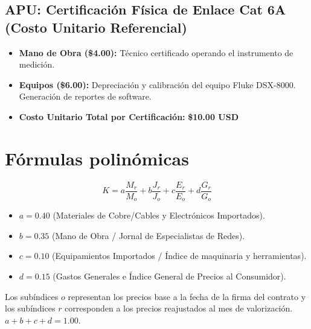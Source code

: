 \subsection*{APU: Certificación Física de Enlace Cat 6A (Costo Unitario Referencial)}

\begin{itemize}
    \item \textbf{Mano de Obra (\$4.00):} Técnico certificado operando el instrumento de medición.
    \item \textbf{Equipos (\$6.00):} Depreciación y calibración del equipo Fluke DSX-8000. Generación de reportes de software.
    \item \textbf{Costo Unitario Total por Certificación:} \textbf{\$10.00 USD}
\end{itemize}

\section{Fórmulas polinómicas}

$$K = a\frac{M_r}{M_o} + b\frac{J_r}{J_o} + c\frac{E_r}{E_o} + d\frac{G_r}{G_o}$$

\begin{itemize}
    \item $a = 0.40$ (Materiales de Cobre/Cables y Electrónicos Importados).
    \item $b = 0.35$ (Mano de Obra / Jornal de Especialistas de Redes).
    \item $c = 0.10$ (Equipamientos Importados / Índice de maquinaria y herramientas).
    \item $d = 0.15$ (Gastos Generales e Índice General de Precios al Consumidor).
\end{itemize}
Los subíndices $o$ representan los precios base a la fecha de la firma del contrato y los subíndices $r$ corresponden a los precios reajustados al mes de valorización. $a + b + c + d = 1.00$.
